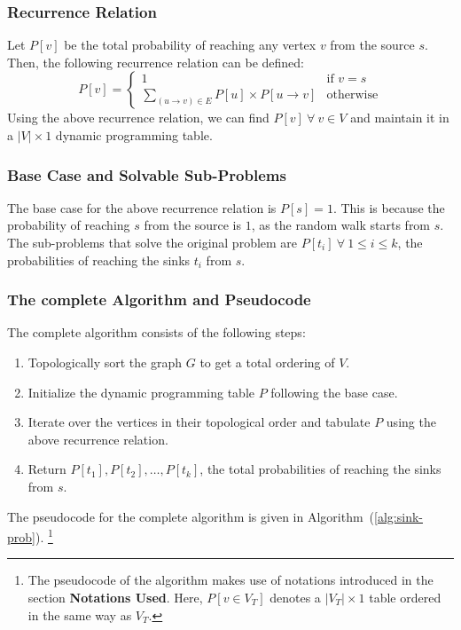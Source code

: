 \documentclass[12pt]{report}
\begin{document}
    \subsubsection*{Recurrence Relation}
    Let $P[v]$ be the total probability of reaching any vertex $v$ from the source $s$.
    Then, the following recurrence relation can be defined:
    \begin{equation}
        P[v] = \begin{cases}
            1 & \text{if } v = s \\
            \sum\limits_{(u \to v) \in E} P[u] \times P[u \to v] & \text{otherwise}
        \end{cases}
    \end{equation}
    Using the above recurrence relation, we can find $P[v] \ \forall \ v \in V$ and maintain it in a $|V| \times 1$ dynamic programming table.

    \subsubsection*{Base Case and Solvable Sub-Problems}
    The base case for the above recurrence relation is $P[s] = 1$.
    This is because the probability of reaching $s$ from the source is $1$, as the random walk starts from $s$.
    \vspace*{10pt} \\
    The sub-problems that solve the original problem are $P[t_{i}] \ \forall \ 1 \leq i \leq k$, the probabilities of reaching the sinks $t_{i}$ from $s$.

    \subsubsection*{The complete Algorithm and Pseudocode}
    The complete algorithm consists of the following steps:
    \begin{enumerate}
        \item Topologically sort the graph $G$ to get a total ordering of $V$.
        \item Initialize the dynamic programming table $P$ following the base case.
        \item Iterate over the vertices in their topological order and tabulate $P$ using the above recurrence relation.
        \item Return $P[t_{1}], P[t_{2}], \dots, P[t_{k}]$, the total probabilities of reaching the sinks from $s$.
    \end{enumerate}
    The pseudocode for the complete algorithm is given in Algorithm~(\ref{alg:sink-prob}).
    \footnote{
        The pseudocode of the algorithm makes use of notations introduced in the section \textbf{Notations Used}.
        Here, $P[v \in V_{T}]$ denotes a $|V_{T}| \times 1$ table ordered in the same way as $V_{T}$.
    }
\end{document}
